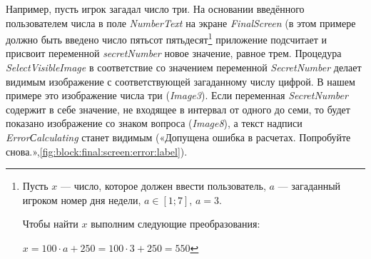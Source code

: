 Например, пусть игрок загадал число три. На основании введённого пользователем числа в поле \textit{NumberText} на экране \textit{FinalScreen}
(в этом примере должно быть введено число пятьсот пятьдесят\footnote[][-0cm]{ Пусть $ x $ — число, которое должен ввести пользователь, $ a $ — загаданный игроком номер дня недели, $ a \in [1;7] $, $ a = 3 $. 

Чтобы найти $ x $ выполним следующие преобразования:

$ x = 100 \cdot a + 250  = 100 \cdot 3 + 250  = 550 $}\marginnote[0.2cm]{} приложение подсчитает и присвоит переменной \textit{secretNumber} новое значение, равное трем.
Процедура \textit{SelectVisibleImage} в соответствие со значением переменной \textit{SecretNumber} делает видимым изображение с соответствующей загаданному числу цифрой. 
В нашем примере это изображение числа три (\textit{Image3}). Если переменная \textit{SecretNumber} содержит в себе значение, не входящее в интервал от одного до семи, то будет показано изображение со знаком вопроса (\textit{Image8}), а текст надписи \textit{ErrorСalculating} станет видимым («Допущена ошибка в расчетах. Попробуйте снова.»,\ref{fig:block:final:screen:error:label}).
